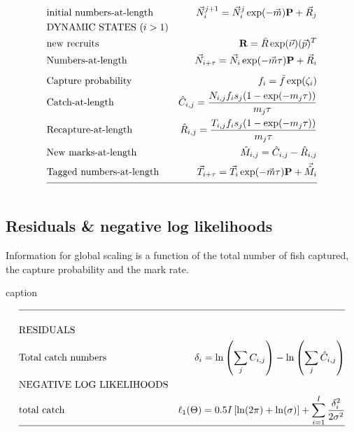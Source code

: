\begin{table}
\begin{footnotesize}
\begin{align}
		&\mbox{initial numbers-at-length}
		&\vec{N}_{i}^{j+1} = \vec{N}_{i}^j \exp(-\vec{m}) \mathbf{P}+
		\vec{R}_{j}
		\label{eq:T1.13}\\
		&\mbox{DYNAMIC STATES ($i>1$)} \nonumber\\
		&\mbox{new recruits}
		&\mathbf{R} = \bar{R}\exp(\vec{\nu}) (\vec{p})^T
		\label{eq:T1.14}\\
		&\mbox{Numbers-at-length}
		&\vec{N}_{i+\tau} = \vec{N}_{i} \exp(-\vec{m} \tau) \mathbf{P} + \vec{R}_i
		\label{eq:T1.15}\\[1ex]
		&\mbox{Capture probability} 
		&f_i = \bar{f} \exp(\zeta_i)
		\label{eq:T1.16}\\
		&\mbox{Catch-at-length}
		&\hat{C}_{i,j} = \frac{N_{i,j}f_i s_j(1-\exp(-m_j\tau))}
		{m_j\tau}
		\label{eq:T1.17}\\
		&\mbox{Recapture-at-length}
		&\hat{R}_{i,j} = \frac{T_{i,j}f_i s_j(1-\exp(-m_j\tau))}
		{m_j\tau}
		\label{eq:T1.18}\\
		&\mbox{New marks-at-length}
		&\hat{M}_{i,j} = \hat{C}_{i,j} - \hat{R}_{i,j}
		\label{eq:T1.19}\\
		&\mbox{Tagged numbers-at-length}
		&\vec{T}_{i+\tau} = \vec{T}_{i}\exp(-\vec{m} \tau) \mathbf{P} 
		+ \vec{\hat{M}}_{i}
		\label{eq:T1.20}\\[1ex]
		\hline \nonumber
    \end{align}
\end{footnotesize}
    \normalEq
\end{table}

\subsection{Residuals \& negative log likelihoods} %
\label{sub:residuals_&_negative_log_likelihoods}
Information for global scaling is a function of the total number of fish captured, the capture probability and the mark rate.



\begin{table}
	\caption{caption}
	\label{table:LSMRresiduals}
	\tableEq
	\begin{align}
		\hline \nonumber \\
		&\mbox{RESIDUALS}\nonumber\\
		&\mbox{Total catch numbers} 
		&\delta_i = \ln\left(\sum_j {C}_{i,j}\right) 
		-\ln \left(\sum_j \hat{C}_{i,j}\right)
		\label{eq:T2.1}\\
		&\mbox{NEGATIVE LOG LIKELIHOODS}\nonumber \\
		&\mbox{total catch}
		&\ell_1(\Theta)=0.5I\left[\ln(2\pi) + \ln(\sigma)\right]
		+\sum_{i=1}^I\frac{\delta_i^2}{2\sigma^2}\\
		\hline \nonumber
	\end{align}
	\normalEq
\end{table}






